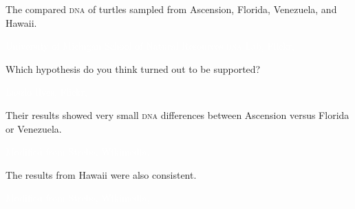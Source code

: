 \documentclass[t]{beamer}
\begin{document}
{
\begin{frame}[b]{The  compared \textsc{dna} of turtles sampled from Ascension, Florida, Venezuela, and Hawaii.}

\tiny\textcolor{white}{University of Michigan School of Natural Resources \textsc{dna} Lab, Flickr, }
\end{frame}
}
%
{
\begin{frame}[b,plain]{Which hypothesis do you think turned out to be supported?}

\hfill\tiny\textcolor{white}{Laszlo Ilyes, Flickr, .}
\end{frame}
}
%
{
\begin{frame}[b]{Their results showed very small \textsc{dna} differences between Ascension versus Florida or Venezuela.}
	
\hfill\tiny\textcolor{white}{Modified from Strebe, Wikimedia, }
\end{frame}
}
%
{
\begin{frame}[b]{The results from Hawaii were also consistent.}
	
\hfill\tiny\textcolor{white}{Modified from Strebe, Wikimedia, }
\end{frame}
}
%
\end{document}
